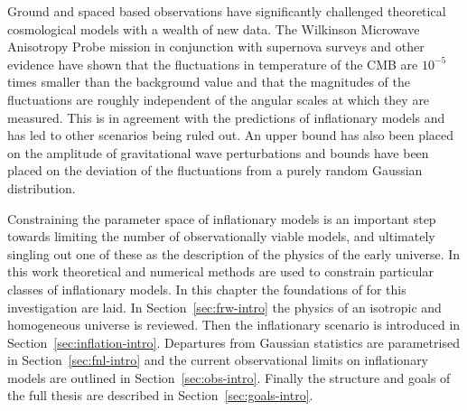 Ground and spaced based observations have significantly challenged theoretical
cosmological models with a wealth of new data. The Wilkinson Microwave
Anisotropy Probe mission \cite{Komatsu:2008hk} in conjunction with supernova
surveys and other evidence have shown that the fluctuations in
temperature of the CMB are $10^{-5}$ times smaller than the background value
and that the magnitudes of the fluctuations are roughly independent of the
angular scales at which they are measured. This is in agreement with the
predictions of inflationary models and has led to other scenarios being ruled
out. An upper bound has also been placed
on the amplitude of gravitational wave perturbations and bounds have been
placed on the deviation of the fluctuations from a purely random Gaussian
distribution.

Constraining the parameter space of inflationary models is an important step
towards limiting the number of observationally viable models, and ultimately
singling out one of these as the description of the physics of the early
universe. In this work theoretical and numerical methods are used to constrain
particular classes of inflationary models. In this chapter the foundations of
for this investigation are laid. In Section~\ref{sec:frw-intro} the physics of
an isotropic and homogeneous universe is reviewed. Then the inflationary
scenario is introduced in Section~\ref{sec:inflation-intro}. Departures from
Gaussian statistics are parametrised in Section~\ref{sec:fnl-intro} and the
current observational limits on inflationary models are outlined in
Section~\ref{sec:obs-intro}. Finally the structure and goals of the full thesis
are described in Section~\ref{sec:goals-intro}.


